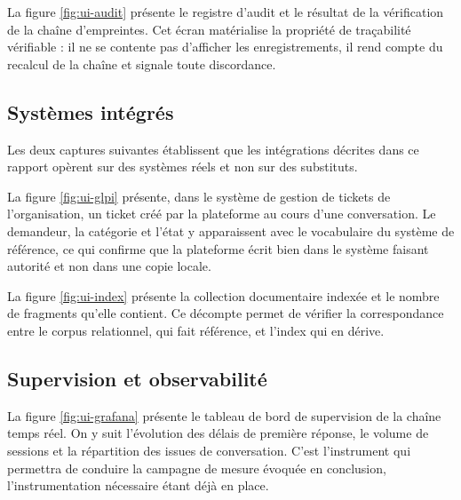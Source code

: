La figure \ref{fig:ui-audit} présente le registre d'audit et le résultat de la vérification de la chaîne d'empreintes. Cet écran matérialise la propriété de traçabilité vérifiable : il ne se contente pas d'afficher les enregistrements, il rend compte du recalcul de la chaîne et signale toute discordance.


\subsection{Systèmes intégrés}

Les deux captures suivantes établissent que les intégrations décrites dans ce rapport opèrent sur des systèmes réels et non sur des substituts.

La figure \ref{fig:ui-glpi} présente, dans le système de gestion de tickets de l'organisation, un ticket créé par la plateforme au cours d'une conversation. Le demandeur, la catégorie et l'état y apparaissent avec le vocabulaire du système de référence, ce qui confirme que la plateforme écrit bien dans le système faisant autorité et non dans une copie locale.


La figure \ref{fig:ui-index} présente la collection documentaire indexée et le nombre de fragments qu'elle contient. Ce décompte permet de vérifier la correspondance entre le corpus relationnel, qui fait référence, et l'index qui en dérive.


\subsection{Supervision et observabilité}

La figure \ref{fig:ui-grafana} présente le tableau de bord de supervision de la chaîne temps réel. On y suit l'évolution des délais de première réponse, le volume de sessions et la répartition des issues de conversation. C'est l'instrument qui permettra de conduire la campagne de mesure évoquée en conclusion, l'instrumentation nécessaire étant déjà en place.

